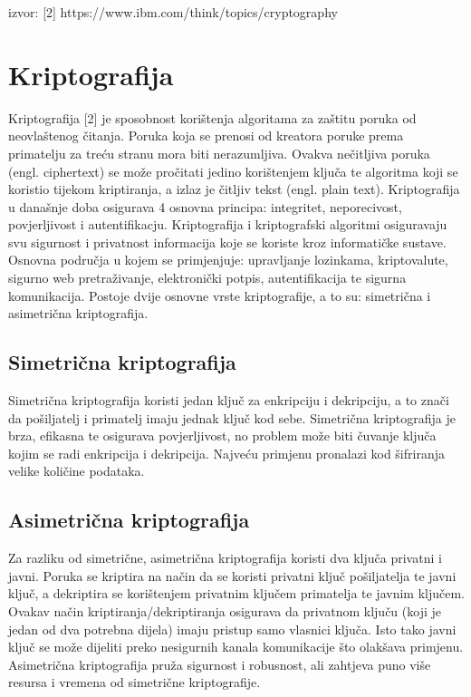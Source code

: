 \documentclass[]{foi}
\begin{document}
\cite{ibm-cryptography}
izvor: [2] https://www.ibm.com/think/topics/cryptography

\chapter{Kriptografija}

Kriptografija [2] je sposobnost korištenja algoritama za zaštitu poruka od neovlaštenog čitanja.
Poruka koja se prenosi od kreatora poruke prema primatelju za treću stranu mora biti nerazumljiva.
Ovakva nečitljiva poruka (engl. ciphertext) se može pročitati jedino korištenjem ključa te algoritma koji se koristio tijekom kriptiranja, a izlaz je čitljiv tekst (engl. plain text).
Kriptografija u današnje doba osigurava 4 osnovna principa: integritet, neporecivost, povjerljivost i autentifikacju.
Kriptografija i kriptografski algoritmi osiguravaju svu sigurnost i privatnost informacija koje se koriste kroz informatičke sustave.
Osnovna područja u kojem se primjenjuje: upravljanje lozinkama, kriptovalute, sigurno web pretraživanje, elektronički potpis, autentifikacija te sigurna komunikacija.
Postoje dvije osnovne vrste kriptografije, a to su: simetrična i asimetrična kriptografija.

\section{Simetrična kriptografija}

Simetrična kriptografija koristi jedan ključ za enkripciju i dekripciju, a to znači da pošiljatelj i primatelj imaju jednak ključ kod sebe.
Simetrična kriptografija je brza, efikasna te osigurava povjerljivost, no problem može biti čuvanje ključa kojim se radi enkripcija i dekripcija.
Najveću primjenu pronalazi kod šifriranja velike količine podataka.


\section{Asimetrična kriptografija}

Za razliku od simetrične, asimetrična kriptografija koristi dva ključa privatni i javni.
Poruka se kriptira na način da se koristi privatni ključ pošiljatelja te javni ključ, a dekriptira se korištenjem privatnim ključem primatelja te javnim ključem.
Ovakav način kriptiranja/dekriptiranja osigurava da privatnom ključu (koji je jedan od dva potrebna dijela) imaju pristup samo vlasnici ključa.
Isto tako javni ključ se može dijeliti preko nesigurnih kanala komunikacije što olakšava primjenu.
Asimetrična kriptografija pruža sigurnost i robusnost, ali zahtjeva puno više resursa i vremena od simetrične kriptografije.
\end{document}
